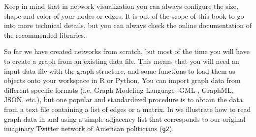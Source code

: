 
Keep in mind that in network visualization you can always configure the size, shape and color of your nodes or edges. It is out of the scope of this book to go into more technical details, but you can always check the online documentation of the recommended libraries.

So far we have created networks from scratch, but most of the time you will have to create a graph from an existing data file. This means that you will need an input data file with the graph structure, and some functions to load them as objects onto your workspace in R or Python. You can import graph data from different specific formats (i.e. Graph Modeling Language -GML-, GraphML, JSON, etc.), but one popular and standardized procedure is to obtain the data from a text file containing a list of edges or a matrix. In   we illustrate how to read graph data in  and  using a simple adjacency list that corresponds to our original imaginary Twitter network of American politicians (\texttt{g2}).


